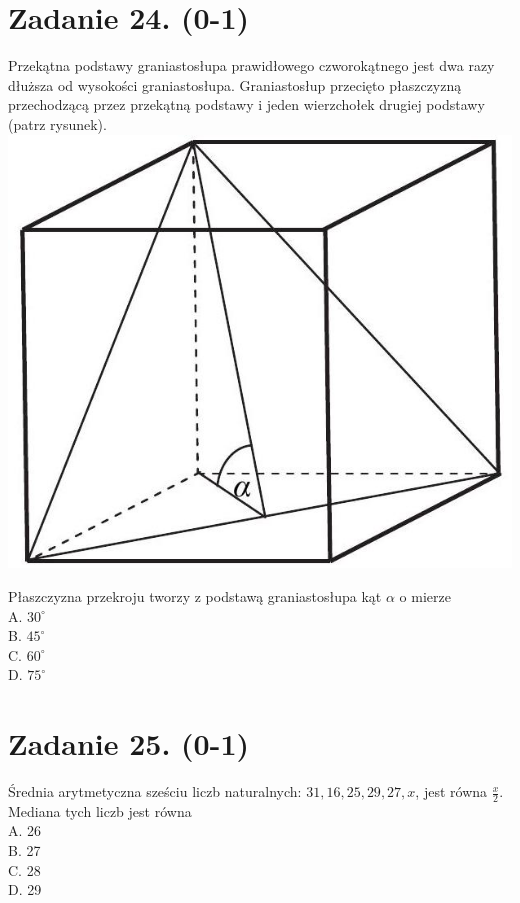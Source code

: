\documentclass[10pt]{article}
\begin{document}
\section*{Zadanie 24. (0-1)}
Przekątna podstawy graniastosłupa prawidłowego czworokątnego jest dwa razy dłuższa od wysokości graniastosłupa. Graniastosłup przecięto płaszczyzną przechodzącą przez przekątną podstawy i jeden wierzchołek drugiej podstawy (patrz rysunek).\\
\includegraphics[max width=\textwidth, center]{2024_11_21_1c92fcc0db78c9202015g-10}

Płaszczyzna przekroju tworzy z podstawą graniastosłupa kąt \(\alpha\) o mierze\\
A. \(30^{\circ}\)\\
B. \(45^{\circ}\)\\
C. \(60^{\circ}\)\\
D. \(75^{\circ}\)

\section*{Zadanie 25. (0-1)}
Średnia arytmetyczna sześciu liczb naturalnych: \(31,16,25,29,27, x\), jest równa \(\frac{x}{2}\). Mediana tych liczb jest równa\\
A. 26\\
B. 27\\
C. 28\\
D. 29
\end{document}

